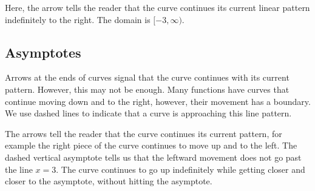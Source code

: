 \documentclass{ximera}
\begin{document}
Here, the arrow tells the reader that the curve continues its current linear pattern indefinitely to the right.  The domain is $[-3, \infty)$.











\subsection*{Asymptotes}


Arrows at the ends of curves signal that the curve continues with its current pattern. However, this may not be enough.  Many functions have curves that continue moving down and to the right, however, their movement has a boundary. We use dashed lines to indicate that a curve is approaching this line pattern.


\begin{image}
\end{image}


The arrows tell the reader that the curve continues its current pattern, for example the right piece of the curve continues to move up and to the left.  The dashed vertical asymptote tells us that the leftward movement does not go past the line $x=3$.  The curve continues to go up indefinitely while getting closer and closer to the asymptote, without hitting the asymptote. 
\end{document}
